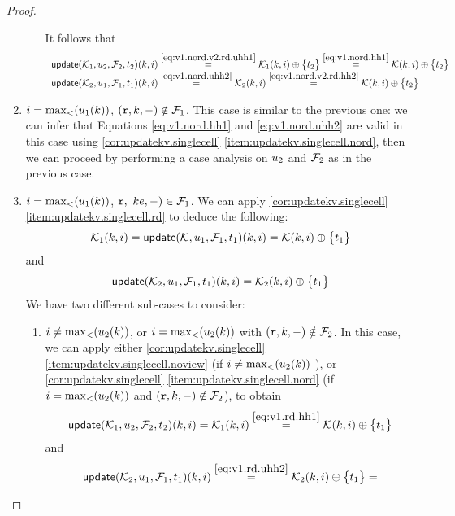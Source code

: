 \begin{proof}
\begin{enumerate}
\begin{enumerate}
\begin{equation}
\end{equation}
It follows that 
\[
\begin{array}{l}
\updateKV(\mkvs_1, \vi_2, \fp_2, \txid_2)(\key, i) \stackrel{\cref{eq:v1.nord.v2.rd.uhh1}}{=} \mkvs_1(\key, i) \oplus \Set{\txid_2} \stackrel{\cref{eq:v1.nord.hh1}}{=} \mkvs(\key, i) \oplus \Set{\txid_2}\\
\updateKV(\mkvs_2,\vi_1,\fp_1, \txid_1)(\key, i) \stackrel{\cref{eq:v1.nord.uhh2}}{=} \mkvs_2(\key, i) \stackrel{\cref{eq:v1.nord.v2.rd.hh2}}{=} \mkvs(\key, i) \oplus \Set{\txid_2}
\end{array}
\]
\end{enumerate}
\item $i = \max_{<}(u_1(k))$, $(\textnormal{\texttt r}, k, -) \notin \mathcal{F}_1$. This case is similar to the previous one: we can infer 
that Equations \cref{eq:v1.nord.hh1} and \cref{eq:v1.nord.uhh2} are valid in this case using \cref{cor:updatekv.singlecell}
\cref{item:updatekv.singlecell.nord}, then we can proceed by performing a case analysis on $u_2$ and $\mathcal{F}_2$ as in the previous case.
\item $i = \max_{<}(u_1(k))$, $\textnormal{\texttt r},\ ke, -) \in \mathcal{F}_1$. We can apply \cref{cor:updatekv.singlecell}\cref{item:updatekv.singlecell.rd} 
to deduce the following: 
\begin{equation}
\mkvs_1(\key, i) = \updateKV(\mkvs, \vi_1, \fp_1, \txid_1)(\key, i) = \mkvs(\key, i) \oplus \Set{\txid_1}
\label{eq:v1.rd.hh1}
\end{equation}
and
\begin{equation}
\updateKV(\mkvs_2, \vi_1, \fp_1, \txid_1)(\key, i) = \mkvs_2(\key, i) \oplus \Set{\txid_1}
\label{eq:v1.rd.uhh2}
\end{equation}
We have two different sub-cases to consider: 
\begin{enumerate}
\item $i \neq \max_{<}(u_2(k))$, or $i = \max_{<}(u_2(k))$ with $(\textnormal{\texttt r},k,-) \notin \mathcal{F}_2$. In this case, we can apply either 
\cref{cor:updatekv.singlecell}\cref{item:updatekv.singlecell.noview} (if $i \neq \max_{<}(u_2(k))$ ), or 
\cref{cor:updatekv.singlecell} \cref{item:updatekv.singlecell.nord} (if $i = \max_{<}(u_2(k))$ and $(\textnormal{\texttt r}, k, -) \notin \mathcal{F}_2$), 
to obtain 
\[
\updateKV(\mkvs_1, \vi_2, \fp_2, \txid_2)(\key, i) = \mkvs_1(\key, i) \stackrel{\cref{eq:v1.rd.hh1}}{=} \mkvs(\key, i) \oplus \Set{\txid_1}
\]
and
\[
\updateKV(\mkvs_2, \vi_1, \fp_1, \txid_1)(\key, i) \stackrel{\cref{eq:v1.rd.uhh2}}{=} \mkvs_2(\key, i) \oplus \Set{ \txid_1 } = 
\]
\end{enumerate}
\end{enumerate}
\end{proof}
